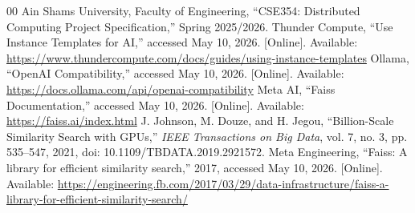 \documentclass[conference]{IEEEtran}
\begin{document}
\begin{thebibliography}{00}
 Ain Shams University, Faculty of Engineering, ``CSE354: Distributed Computing Project Specification,'' Spring 2025/2026.
 Thunder Compute, ``Use Instance Templates for AI,'' accessed May 10, 2026. [Online]. Available: \url{https://www.thundercompute.com/docs/guides/using-instance-templates}
 Ollama, ``OpenAI Compatibility,'' accessed May 10, 2026. [Online]. Available: \url{https://docs.ollama.com/api/openai-compatibility}
 Meta AI, ``Faiss Documentation,'' accessed May 10, 2026. [Online]. Available: \url{https://faiss.ai/index.html}
 J. Johnson, M. Douze, and H. Jegou, ``Billion-Scale Similarity Search with GPUs,'' \emph{IEEE Transactions on Big Data}, vol. 7, no. 3, pp. 535--547, 2021, doi: 10.1109/TBDATA.2019.2921572.
 Meta Engineering, ``Faiss: A library for efficient similarity search,'' 2017, accessed May 10, 2026. [Online]. Available: \url{https://engineering.fb.com/2017/03/29/data-infrastructure/faiss-a-library-for-efficient-similarity-search/}
\end{thebibliography}
\end{document}
